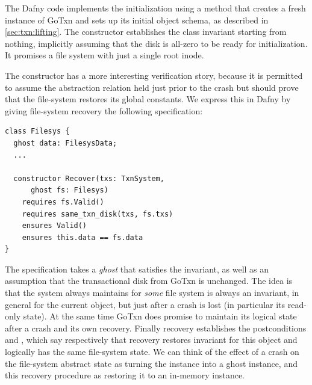 The Dafny code implements the initialization using a  method
that creates a fresh instance of GoTxn and sets up its initial object schema, as
described in \cref{sec:txn:lifting}. The  constructor establishes the
class invariant  starting from nothing, implicitly assuming that the
disk is all-zero to be ready for initialization. It promises a file
system with just a single root inode.

The  constructor has a more interesting verification story, because
it is permitted to assume the abstraction relation held just prior to the crash
but should prove that the file-system restores its global constants. We express
this in Dafny by giving file-system recovery the following specification:

\begin{verbatim}
class Filesys {
  ghost data: FilesysData;
  ...

  constructor Recover(txs: TxnSystem,
      ghost fs: Filesys)
    requires fs.Valid()
    requires same_txn_disk(txs, fs.txs)
    ensures Valid()
    ensures this.data == fs.data
}
\end{verbatim}

The specification takes a \emph{ghost}  that satisfies the invariant, as
well as an assumption that the transactional disk from GoTxn is unchanged. The
idea is that the system always maintains  for \emph{some} file
system is always an invariant, in general for the current  object, but
just after a crash  is lost (in particular its read-only state). At the
same time GoTxn does promise to maintain its logical state after a crash and its
own recovery. Finally recovery establishes the postconditions  and
, which say respectively that recovery restores
invariant for this  object and logically has the same file-system
state. We can think of the effect of a crash on the file-system abstract state
as turning the  instance into a ghost instance, and this recovery
procedure as restoring it to an in-memory instance.

